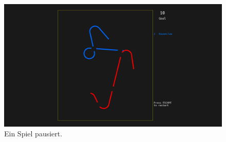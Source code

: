 \documentclass[doktyp=studarbeit]{TUBAFarbeiten}
\begin{document}
\begin{figure}[!htb]
	\centering
	\includegraphics[width=0.9\linewidth]{5.png}
	\caption{Ein Spiel pausiert.}
	\label{fig:pause}
\end{figure}


\printbibliography[heading=bibintoc]
\end{document}
